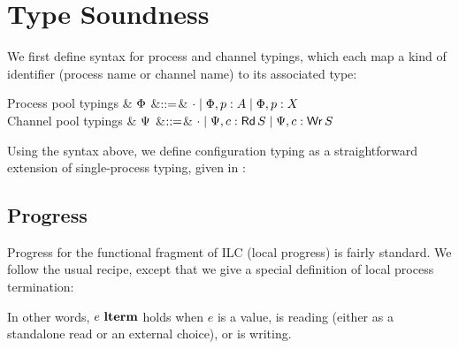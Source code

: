 \section{Type Soundness}
\label{sec:ilcproofs}

We first define syntax for process and channel typings, which each map a kind of
identifier (process name or channel name) to its associated type:

\begin{grammar}
    Process pool typings
    & $\Phi$
    &$\mathrel{::=}$& $\cdot \mathrel{\mid} \Phi,p: A \mathrel{\mid} \Phi,p: X$
    \\
    Channel pool typings
    & $\Psi$
    &$\mathrel{::=}$& $\cdot \mathrel{\mid} \Psi,c:\textnormal{\textsf{Rd}}\,S \mathrel{\mid} \Psi,c:\textnormal{\textsf{Wr}}\,S$
\end{grammar}


Using the syntax above, we define configuration typing as a straightforward extension
of single-process typing, given in :\smallskip


\subsection{Progress}
\label{subsec:label}

Progress for the functional fragment of ILC (local progress) is fairly
standard. We follow the usual recipe, except that we give a special definition
of local process termination:\smallskip

In other words, $e~\textbf{lterm}$ holds when $e$ is a value, is reading (either as a
standalone read or an external choice), or is writing.

